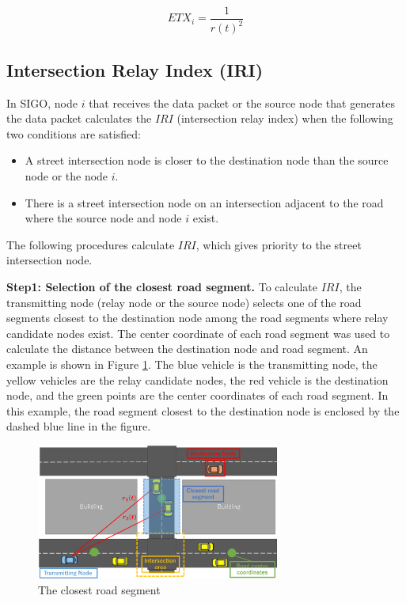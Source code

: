 \documentclass[conference]{IEEEtran}
\begin{document}
 \begin{equation}
 \label{equ-intersection}
 ETX_i = \frac{1}{  {r(t)}^{2}   } 
 \end{equation}


\subsection{Intersection Relay Index (IRI)}

In SIGO, node $i$ that receives the data packet or the  source node that generates the data packet calculates the 
$IRI$ (intersection relay index) when the following two conditions are satisfied:
\begin{itemize}
\item A street intersection node is closer to the destination node than the source node or the node $i$.
\item There is a street intersection node on an intersection adjacent to the road where the source node and node $i$ exist.
\end{itemize}

The following procedures calculate $IRI$, which gives priority to  the street intersection node.

\textbf{Step1: Selection of the closest road segment.}
To calculate $IRI$, the transmitting node (relay node or the source node) selects one of the road segments closest to the destination node among the road segments where relay candidate nodes exist.
The center coordinate of each road segment was used to calculate the distance between the destination node and road segment. An example is shown in Figure \ref{fig:closest_road}.
The blue vehicle is the transmitting node, the yellow vehicles are the relay candidate nodes, the red vehicle is the destination node, and the green points are the center coordinates of each road segment. In this example, the road segment closest to the destination node is  enclosed by the dashed blue line in the figure.

\begin{figure}[!ht]
\centering
\includegraphics[width=80mm]{figures/closest_road.eps}
\caption{The closest road segment}
\label{fig:closest_road}
\end{figure}
\end{document}
